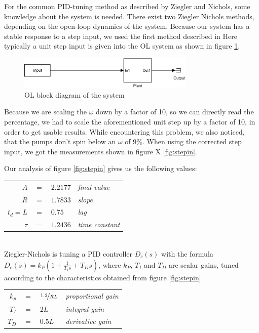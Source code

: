 For the common PID-tuning method as described by Ziegler and Nichols,
some knowledge about the system is needed.
There exist two Ziegler Nichols methods,
depending on the open-loop dynamics of the system.
Because our system has a stable response to a step input, we used the first method described in 
Here typically a unit step input is given into the OL system as shown in figure \ref{fig:OL}.

\begin{figure}[H]
    \centering
    \includegraphics[width=0.75\textwidth]{figures/04ExperimentsAndLabWork/OLblock.pdf}
    \caption{OL block diagram of the system}
\label{fig:OL}
\end{figure}

Because we are scaling the $\omega$ down by a factor of 10, so we can directly read the percentage,
we had to scale the aforementioned unit step up by a factor of 10,
in order to get usable results.
While encountering this problem, we also noticed, that the pumps don't spin below an $\omega$ of 9\%.
When using the corrected step input, we got the measurements shown in figure X \ref{fig:stepin}.

Our analysis of figure \ref{fig:stepin} gives us the following values:
\\
\begin{tabular}{r c l l}
	$A$ 	& $=$ & $2.2177$ 	& \footnotesize{\textit{final value}}\\
	$R$ 	& $=$ & $1.7833$ 	& \footnotesize{\textit{slope}}\\
	$t_d=L$	& $=$ & $0.75$ 		& \footnotesize{\textit{lag}}\\
	$\tau$ 	& $=$ & $1.2436$ 	& \footnotesize{\textit{time constant}}
\end{tabular}
\\
Ziegler-Nichols is tuning a PID controller $D_c(s)$ with the formula\\
$D_c(s)=k_P(1+ \frac{1}{T_Is}+T_Ds)$,
where $k_P$, $T_I$ and $T_D$ are scalar gains,
tuned according to the characteristics obtained from figure \ref{fig:stepin}.

\begin{tabular}{r c l l}
	$k_p$ & $=$ & $\nicefrac{1.2}{RL}$	& \footnotesize{\textit{proportional gain}}\\
	$T_I$ & $=$ & $2L$					& \footnotesize{\textit{integral gain}}\\
	$T_D$ & $=$ & $0.5L$ 				& \footnotesize{\textit{derivative gain}}\\
\end{tabular}


